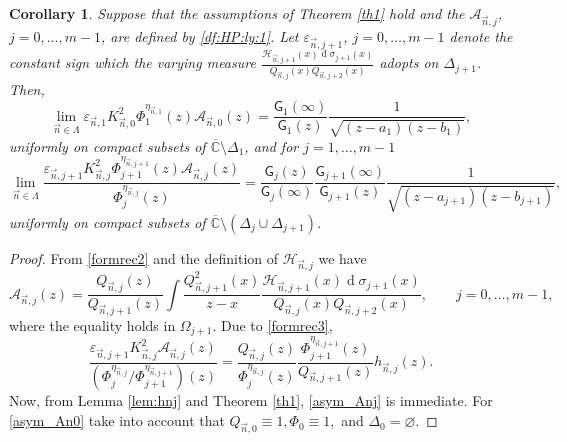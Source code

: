 \documentclass{amsart}
\numberwithin{equation}{section}
\newtheorem{corollary}[theorem]{Corollary}
\theoremstyle{definition}
\DeclareMathOperator{\D}{d}        %
\newcommand{\CC}{\mathbb{C}}      %
\newcommand{\n}{\vec{n}}          %
\begin{document}
\begin{corollary}
	\label{asym_forms}
	Suppose that the assumptions of Theorem \ref{th1} hold and the $\mathcal{A}_{\n,j}$, $j=0,\ldots,m-1$, are defined by \eqref{df:HP:ly:1}. Let $\varepsilon_{\n,j+1}$, $j=0,\ldots,m-1$ denote the constant sign which the varying measure $\frac{\mathcal{H}_{\n,j+1}(x) \D \sigma_{j+1}(x)}{Q_{\n,j}(x)Q_{\n,j+2}(x)}$ adopts on $\Delta_{j+1}$. Then,
	\begin{equation}
		\label{asym_An0}
		\lim_{\n\in\Lambda}  {\varepsilon_{\n,1}K_{\n,0}^2\Phi_{1}^{\eta_{\n,1}}(z)\mathcal{A}_{\n,0}(z)}  = \frac{\mathsf{G}_{1}(\infty)}{\mathsf{G}_{1}(z)} \frac{1}{\sqrt{(z-a_{1})(z-b_{1})}},
	\end{equation}
  uniformly on compact subsets of $\overline{\CC}\setminus\Delta_1$, and for $j=1,\ldots,m-1$
	\begin{equation}
		\label{asym_Anj}
	\lim_{\n\in\Lambda} \frac{\varepsilon_{\n,j+1}K_{\n,j}^2\Phi_{j+1}^{\eta_{\n,j+1}}(z)\mathcal{A}_{\n,j}(z)}{\Phi_j^{\eta_{\n,j}}(z)} = \frac{\mathsf{G}_{j}(z)}{\mathsf{G}_{j}(\infty)} \frac{\mathsf{G}_{j+1}(\infty)}{\mathsf{G}_{j+1}(z)} \frac{1}{\sqrt{(z-a_{j+1})(z-b_{j+1})}},
	\end{equation}
	uniformly on compact subsets of $\overline{\CC}\setminus(\Delta_j \cup \Delta_{j+1})$.  	
\end{corollary}
\begin{proof}
	From \eqref{formrec2} and the definition of $\mathcal{H}_{\n,j}$ we have
	\[
	\mathcal{A}_{\n,j}(z) = \frac{Q_{\n,j}(z)}{Q_{\n,j+1}(z)} \int \frac{Q_{\n,j+1}^2(x)}{z-x}\frac{\mathcal{H}_{\n,j+1}(x)\D\sigma_{j+1}(x)}{Q_{\n,j}(x)Q_{\n,j+2}(x)}, \qquad j=0,\ldots,m-1,
	\]
	where the equality holds in $\Omega_{j+1}$. Due to \eqref{formrec3},
	\[
	  \frac{\varepsilon_{\n,j+1}K_{\n,j}^2\mathcal{A}_{\n,j}(z)}{(\Phi_j^{\eta_{\n,j}}/\Phi_{j+1}^{\eta_{\n,j+1}})(z)} = \frac{Q_{\n,j}(z)}{\Phi_j^{\eta_{\n,j}}(z)}\frac{\Phi_{j+1}^{\eta_{\n,j+1}}(z)}{Q_{\n,j+1}(z)}h_{\n,j}(z).
	\]
Now, from Lemma \ref{lem:hnj} and Theorem \ref{th1}, \eqref{asym_Anj} is immediate. For \eqref{asym_An0} take into account that $Q_{\n,0}\equiv 1, \Phi_0 \equiv 1,$ and $\Delta_0=\varnothing$.
\end{proof}
\end{document}
